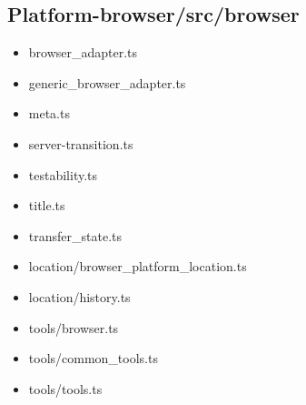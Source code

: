 \subsection{Platform-browser/src/browser}


\begin{itemize}
  \item browser\_adapter.ts
  \item generic\_browser\_adapter.ts
  \item meta.ts
  \item server-transition.ts
  \item testability.ts
  \item title.ts
  \item transfer\_state.ts
  \item location/browser\_platform\_location.ts
  \item location/history.ts
  \item tools/browser.ts
  \item tools/common\_tools.ts
  \item tools/tools.ts
\end{itemize}














